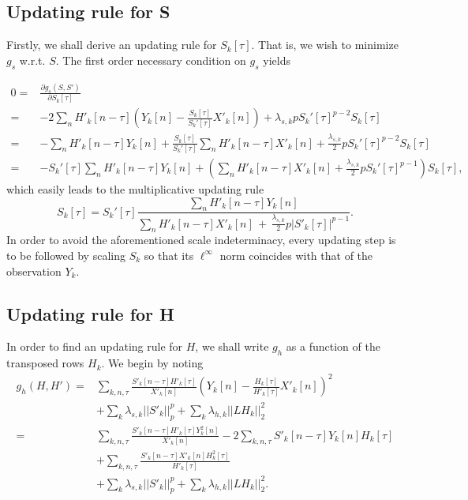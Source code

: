 \documentclass[12pt]{article}
\begin{document}
\subsection{Updating rule for S}

Firstly, we shall derive an updating rule for $S_k[\tau]$. That is, we wish to minimize $g_s$ w.r.t. $S$. The first order necessary condition on $g_s$ yields

\small
\begin{align}
0 = & \frac{\partial g_s(S,S')}{\partial S_k[\tau] } \nonumber \\
 = & -2 \sum_n H'_k[n-\tau]\left(Y_k[n]-\frac{S_k[\tau]}{S_k'[\tau]}X'_k[n]\right)+\lambda_{s,k}pS_k'[\tau]^{p-2}S_k[\tau] \nonumber \\
 = & -\sum_n H'_k[n-\tau]Y_k[n]+\frac{S_k[\tau]}{S_k'[\tau]}\sum_n H'_k[n-\tau] X'_k[n]+\frac{\lambda_{s,k}}{2}pS_k'[\tau]^{p-2}S_k[\tau] \nonumber \\
 = & -S_k'[\tau] \sum_n H'_k[n-\tau]Y_k[n]+\left(\sum_n H'_k[n-\tau] X'_k[n] +\frac{\lambda_{s,k}}{2}pS_k'[\tau]^{p-1}\right)S_k[\tau], \nonumber
\end{align}
\normalsize
%
which easily leads to the multiplicative updating rule
%
\begin{equation} \nonumber
S_k[\tau] = S_k'[\tau]\frac{\sum_n H'_k[n-\tau]Y_k[n]}{\sum_n H'_k[n-\tau]X'_k[n] \,+\,\frac{\lambda_{s,k}}{2}p|S'_k[\tau]|^{p-1}}.
\end{equation}
%
In order to avoid the aforementioned scale indeterminacy, every updating step is to be followed by scaling $S_k$ so that its $\ell^\infty$ norm coincides with that of the observation $Y_k$.



\subsection{Updating rule for H}

In order to find an updating rule for $H$, we shall write $g_h$ as a function of the transposed rows $H_k$. We begin by noting
%
\begin{align}\nonumber
g_h(H,H') = &\sum_{k,n,\tau} \frac{S'_k[n-\tau]H'_k[\tau]}{X'_k[n]}\left( Y_k[n]-\frac{H_k[\tau]}{H'_k[\tau]}X'_k[n] \right)^2 \nonumber \\
&+\sum_{k}\lambda_{s,k} ||S'_k||_p^p +\sum_{k} \lambda_{h,k}||LH_k||_2^2 \nonumber \\
= &\sum_{k,n,\tau}\frac{S'_k[n-\tau]H'_k[\tau]Y_k^2[n]}{X'_k[n]} -2\sum_{k,n,\tau}S'_k[n-\tau]Y_k[n]H_k[\tau] \nonumber \\  &+\sum_{k,n,\tau}\frac{S'_k[n-\tau]X'_k[n]H^2_k[\tau]}{H'_k[\tau]}\nonumber \\
&+\sum_{k}\lambda_{s,k} ||S'_k||_p^p +\sum_{k} \lambda_{h,k}||LH_k||_2^2. \nonumber
\end{align}
\end{document}
